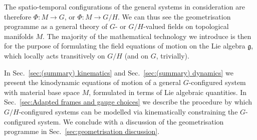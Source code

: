 The spatio-temporal configurations of the general systems in consideration are therefore $\Phi : M \to G$, or $\Phi : M \to G/H$. We can thus see the geometrisation programme as a general theory of $G$- or $G/H$-valued fields on topological manifolds $M$. The majority of the mathematical technology we introduce is then for the purpose of formulating the field equations of motion on the Lie algebra $\mathfrak{g}$, which locally acts transitively on $G/H$ (and on $G$, trivially).

In Sec.~\ref{sec:(summary) kinematics} and Sec.~\ref{sec:(summary) dynamics} we present the kinodynamic equations of motion of a general $G$-configured system with material base space $M$, formulated in terms of Lie algebraic quantities. In Sec.~\ref{sec:Adapted frames and gauge choices} we describe the procedure by which $G/H$-configured systems can be modelled via kinematically constraining the $G$-configured system. We conclude with a discussion of the geometrisation programme in Sec.~\ref{sec:geometrisation discussion}.



